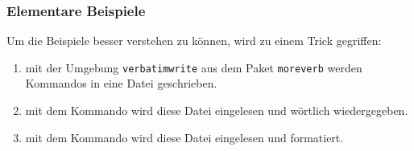 \subsubsection{Elementare Beispiele}
\label{sec:elementare-beispiele}

Um die Beispiele besser verstehen zu können, wird zu einem Trick gegriffen:
\begin{enumerate}
  \item mit der Umgebung \texttt{verbatimwrite} aus dem Paket \texttt{moreverb}
    werden Kommandos in eine Datei geschrieben.
  \item mit dem Kommando \lstinline|| wird diese Datei
    eingelesen und wörtlich wiedergegeben.
  \item mit dem Kommando \lstinline|| wird diese Datei
    eingelesen und formatiert.
\end{enumerate}


